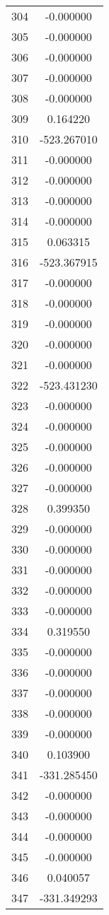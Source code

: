 \documentclass[12pt]{article}
\begin{document}
\begin{longtable}{@{}cc@{}}
304 & -0.000000 \\
305 & -0.000000 \\
306 & -0.000000 \\
307 & -0.000000 \\
308 & -0.000000 \\
309 & 0.164220 \\
310 & -523.267010 \\
311 & -0.000000 \\
312 & -0.000000 \\
313 & -0.000000 \\
314 & -0.000000 \\
315 & 0.063315 \\
316 & -523.367915 \\
317 & -0.000000 \\
318 & -0.000000 \\
319 & -0.000000 \\
320 & -0.000000 \\
321 & -0.000000 \\
322 & -523.431230 \\
323 & -0.000000 \\
324 & -0.000000 \\
325 & -0.000000 \\
326 & -0.000000 \\
327 & -0.000000 \\
328 & 0.399350 \\
329 & -0.000000 \\
330 & -0.000000 \\
331 & -0.000000 \\
332 & -0.000000 \\
333 & -0.000000 \\
334 & 0.319550 \\
335 & -0.000000 \\
336 & -0.000000 \\
337 & -0.000000 \\
338 & -0.000000 \\
339 & -0.000000 \\
340 & 0.103900 \\
341 & -331.285450 \\
342 & -0.000000 \\
343 & -0.000000 \\
344 & -0.000000 \\
345 & -0.000000 \\
346 & 0.040057 \\
347 & -331.349293 \\

\end{longtable}
\end{document}
